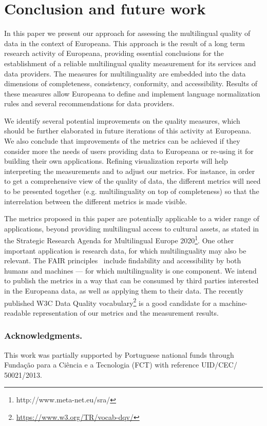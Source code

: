 
\section{Conclusion and future work}

In this paper we present our approach for assessing the multilingual quality of data in the context of Europeana. This approach is the result of a long term research activity of Europeana, providing essential conclusions for the establishment of a reliable multilingual quality measurement for its services and data providers. The measures for multilinguality are embedded into the data dimensions of completeness, consistency, conformity, and accessibility. Results of these measures allow Europeana to define and implement language normalization rules and several recommendations for data providers.

We identify several potential improvements on the quality measures, which should be further elaborated in future iterations of this activity at Europeana. We also conclude that improvements of the metrics can be achieved if they consider more the needs of users providing data to Europeana or re-using it for building their own applications. Refining visualization reports will help interpreting the measurements and to adjust our metrics. For instance, in order to get a comprehensive view of the quality of data, the different metrics will need to be presented together (e.g. multilinguality on top of completeness) so that the interrelation between the different metrics is made visible. 

The metrics proposed in this paper are potentially applicable to a wider range of applications, beyond providing multilingual access to cultural assets, as stated in the Strategic Research Agenda for Multilingual Europe 2020\footnote{http://www.meta-net.eu/sra/}. One other important application is research data, for which multilinguality may also be relevant. The FAIR principles~\cite{wilkinson2016} include findability and accessibility by both humans and machines --- for which multilinguality is one component. 
We intend to publish the metrics in a way that can be consumed by third parties interested in the Europeana data, as well as applying them to their data. The recently published W3C Data Quality vocabulary\footnote{ \url{https://www.w3.org/TR/vocab-dqv/}} is a good candidate for a machine-readable representation of our metrics and the measurement results.

\subsubsection{Acknowledgments.} This work was partially supported by Portuguese national funds through Fundação para a Ciência e a Tecnologia (FCT) with reference UID/CEC/
50021/2013.

% 
% 
